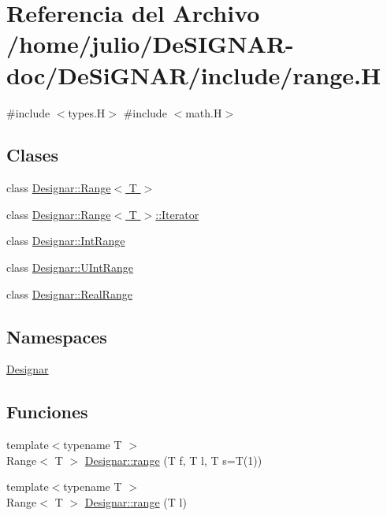 \hypertarget{range_8_h}{}\section{Referencia del Archivo /home/julio/\+De\+S\+I\+G\+N\+A\+R-\/doc/\+De\+Si\+G\+N\+A\+R/include/range.H}
\label{range_8_h}
{\ttfamily \#include $<$types.\+H$>$}\newline
{\ttfamily \#include $<$math.\+H$>$}\newline
\subsection*{Clases}
\begin{DoxyCompactItemize}
\item 
class \hyperlink{class_designar_1_1_range}{Designar\+::\+Range$<$ T $>$}
\item 
class \hyperlink{class_designar_1_1_range_1_1_iterator}{Designar\+::\+Range$<$ T $>$\+::\+Iterator}
\item 
class \hyperlink{class_designar_1_1_int_range}{Designar\+::\+Int\+Range}
\item 
class \hyperlink{class_designar_1_1_u_int_range}{Designar\+::\+U\+Int\+Range}
\item 
class \hyperlink{class_designar_1_1_real_range}{Designar\+::\+Real\+Range}
\end{DoxyCompactItemize}
\subsection*{Namespaces}
\begin{DoxyCompactItemize}
\item 
 \hyperlink{namespace_designar}{Designar}
\end{DoxyCompactItemize}
\subsection*{Funciones}
\begin{DoxyCompactItemize}
\item 
{\footnotesize template$<$typename T $>$ }\\Range$<$ T $>$ \hyperlink{namespace_designar_aae435a76c71e126af37716ef5549d79d}{Designar\+::range} (T f, T l, T s=T(1))
\item 
{\footnotesize template$<$typename T $>$ }\\Range$<$ T $>$ \hyperlink{namespace_designar_a98dd2d05fccceaa32cdbf3f34c7dc120}{Designar\+::range} (T l)
\end{DoxyCompactItemize}
